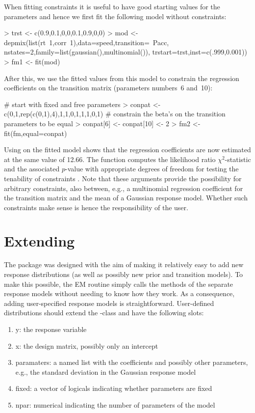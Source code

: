 \documentclass[article]{jss}
\begin{document}
When fitting constraints it is useful to have good starting values 
for the parameters and hence we first fit the following model without
constraints:
\begin{CodeChunk}
\begin{CodeInput}
> trst <- c(0.9,0.1,0,0,0.1,0.9,0,0)
> mod <- depmix(list(rt~1,corr~1),data=speed,transition=~Pacc,
	  nstates=2,family=list(gaussian(),multinomial()),
	  trstart=trst,inst=c(.999,0.001))
> fm1 <- fit(mod)
\end{CodeInput}
\end{CodeChunk}
After this, we use the fitted values from this model to constrain the 
regression coefficients on the transition matrix (parameters numbers~6 and~10):
\begin{CodeChunk}
\begin{CodeInput}
# start with fixed and free parameters
> conpat <- c(0,1,rep(c(0,1),4),1,1,0,1,1,1,0,1)
# constrain the beta's on the transition parameters to be equal
> conpat[6] <- conpat[10] <- 2
> fm2 <- fit(fm,equal=conpat)
\end{CodeInput}
\end{CodeChunk}
Using  on the fitted model shows that the regression 
coefficients are now estimated at the same value of 12.66. The function
 computes the likelihood ratio $\chi^2$-statistic and the
associated $p$-value with appropriate degrees of freedom for testing the
tenability of constraints \citep{Dannemann2007}. Note that these arguments 
provide the possibility for arbitrary 
constraints, also between, e.g., a multinomial regression coefficient 
for the transition matrix and the mean of a Gaussian response model. 
Whether such constraints make sense is hence the responsibility of 
the user. 

\section[Extending depmixS4]{Extending }

The  package was designed with the aim of making it relatively
easy to add new response distributions (as well as possibly new prior and 
transition models). 
To make this possible, the EM routine simply calls the  methods 
of the separate response models without needing to know how they work. As a 
consequence, adding user-specified response models is straightforward. 
User-defined distributions should extend the -class 
and have the following slots:
\begin{enumerate}
	\item y: the response variable
	\item x: the design matrix, possibly only an intercept
	\item paramaters: a named list with the coefficients and possibly 
	other parameters, e.g., the standard deviation in the Gaussian 
	response model
	\item fixed: a vector of logicals indicating whether parameters are 
	fixed
	\item npar: numerical indicating the number of parameters of the model
\end{enumerate}
\end{document}
